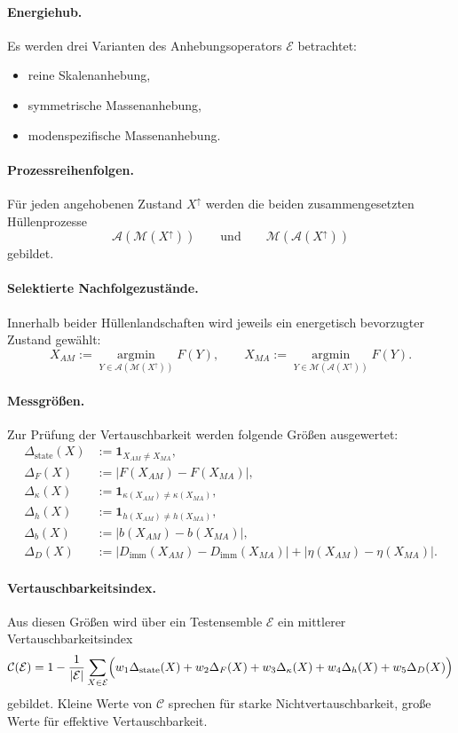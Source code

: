 \documentclass[11pt,a4paper]{article}
\theoremstyle{definition}
\begin{document}
\paragraph{Energiehub.}
Es werden drei Varianten des Anhebungsoperators \(\mathcal E\) betrachtet:
\begin{itemize}
	\item reine Skalenanhebung,
	\item symmetrische Massenanhebung,
	\item modenspezifische Massenanhebung.
\end{itemize}

\paragraph{Prozessreihenfolgen.}
Für jeden angehobenen Zustand \(X^\uparrow\) werden die beiden zusammengesetzten Hüllenprozesse
\[
\mathcal A(\mathcal M(X^\uparrow))
\qquad\text{und}\qquad
\mathcal M(\mathcal A(X^\uparrow))
\]
gebildet.

\paragraph{Selektierte Nachfolgezustände.}
Innerhalb beider Hüllenlandschaften wird jeweils ein energetisch bevorzugter Zustand gewählt:
\[
X_{AM}:=\operatorname*{argmin}_{Y\in \mathcal A(\mathcal M(X^\uparrow))}F(Y),
\qquad
X_{MA}:=\operatorname*{argmin}_{Y\in \mathcal M(\mathcal A(X^\uparrow))}F(Y).
\]

\paragraph{Messgrößen.}
Zur Prüfung der Vertauschbarkeit werden folgende Größen ausgewertet:
\begin{align*}
	\Delta_{\mathrm{state}}(X)&:=\mathbf 1_{X_{AM}\neq X_{MA}},\\
	\Delta_F(X)&:=|F(X_{AM})-F(X_{MA})|,\\
	\Delta_\kappa(X)&:=\mathbf 1_{\kappa(X_{AM})\neq \kappa(X_{MA})},\\
	\Delta_h(X)&:=\mathbf 1_{h(X_{AM})\neq h(X_{MA})},\\
	\Delta_b(X)&:=|b(X_{AM})-b(X_{MA})|,\\
	\Delta_D(X)&:=|D_{\mathrm{imm}}(X_{AM})-D_{\mathrm{imm}}(X_{MA})|+|\eta(X_{AM})-\eta(X_{MA})|.
\end{align*}

\paragraph{Vertauschbarkeitsindex.}
Aus diesen Größen wird über ein Testensemble \(\mathcal E\) ein mittlerer Vertauschbarkeitsindex
\[
\mathcal C(\mathcal E)
=
1-\frac1{|\mathcal E|}\sum_{X\in\mathcal E}
\Bigl(
w_1\Delta_{\mathrm{state}}(X)
+w_2\Delta_F(X)
+w_3\Delta_\kappa(X)
+w_4\Delta_h(X)
+w_5\Delta_D(X)
\Bigr)
\]
gebildet. Kleine Werte von \(\mathcal C\) sprechen für starke Nichtvertauschbarkeit, große Werte für effektive Vertauschbarkeit.
\end{document}
